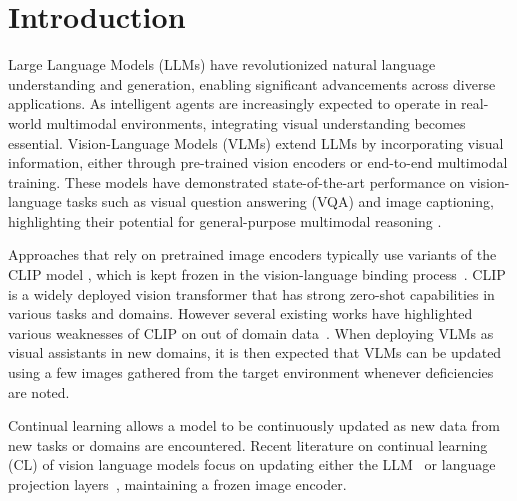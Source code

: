 \section{Introduction}\label{sec:intro}

Large Language Models (LLMs) have revolutionized natural language understanding and generation, enabling significant advancements across diverse applications. As intelligent agents are increasingly expected to operate in real-world multimodal environments, integrating visual understanding becomes essential. Vision-Language Models (VLMs) extend LLMs by incorporating visual information, either through pre-trained vision encoders or end-to-end multimodal training. These models have demonstrated state-of-the-art performance on vision-language tasks such as visual question answering (VQA) and image captioning, highlighting their potential for general-purpose multimodal reasoning \cite{chen2024internvl,Qwen2VL}.

Approaches that rely on pretrained image encoders typically use variants of the CLIP model \citep{radford2021learning}, which is kept frozen in the vision-language binding process~\cite{liu2024visual}. CLIP is a widely deployed vision transformer that has strong zero-shot capabilities in various tasks and domains. However several  existing works have highlighted various weaknesses of CLIP on out of domain data~\cite{liu2024visual,zhu2023minigpt,chen2023minigpt,li2023blip,tong2024eyes}. When deploying VLMs as visual assistants in new domains, it is then expected that VLMs can be updated using a few images gathered from the target environment whenever deficiencies are noted. 

Continual learning allows a model to be continuously updated as new data from new tasks or domains are encountered.  Recent literature on continual learning (CL) of vision language models focus on updating either the LLM~\cite{srivastava2024improving} or language projection layers~\cite{das2024one}, maintaining a frozen image encoder. 

